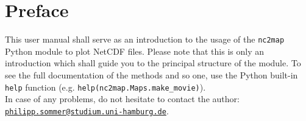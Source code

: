 \chapter{Preface}
This user manual shall serve as an introduction to the usage of the \lstinline|nc2map| Python module to plot NetCDF files. Please note that this is only an introduction which shall guide you to the principal structure of the module. To see the full documentation of the methods and so one, use the Python built-in \lstinline|help| function (e.g. \lstinline|help(nc2map.Maps.make_movie)|). \\
In case of any problems, do not hesitate to contact the author: \\
\href{mailto:philipp.sommer@studium.uni-hamburg.de}{\nolinkurl{philipp.sommer@studium.uni-hamburg.de}}.